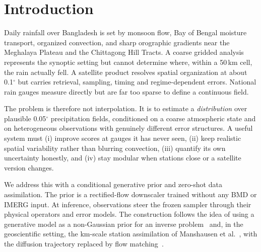 \documentclass[10pt,twocolumn]{article}
\begin{document}
\section{Introduction}

Daily rainfall over Bangladesh is set by monsoon flow, Bay of Bengal moisture
transport, organized convection, and sharp orographic gradients near the
Meghalaya Plateau and the Chittagong Hill Tracts. A coarse gridded analysis
represents the synoptic setting but cannot determine where, within a 50\,km
cell, the rain actually fell. A satellite product resolves spatial
organization at about 0.1$^\circ$ but carries retrieval, sampling, timing and
regime-dependent errors. National rain gauges measure directly but are far too
sparse to define a continuous field.

The problem is therefore not interpolation. It is to estimate a
\emph{distribution} over plausible 0.05$^\circ$ precipitation fields,
conditioned on a coarse atmospheric state and on heterogeneous observations
with genuinely different error structures. A useful system must (i) improve
scores at gauges it has never seen, (ii) keep realistic spatial variability
rather than blurring convection, (iii) quantify its own uncertainty honestly,
and (iv) stay modular when stations close or a satellite version changes.

We address this with a conditional generative prior and zero-shot data
assimilation. The prior is a rectified-flow downscaler trained without any BMD
or IMERG input. At inference, observations steer the frozen sampler through
their physical operators and error models. The construction follows the idea
of using a generative model as a non-Gaussian prior for an inverse
problem~\cite{chung2023,rozet2023sda} and, in the geoscientific setting, the
km-scale station assimilation of Manshausen et al.~\cite{manshausen2025},
with the diffusion trajectory replaced by flow
matching~\cite{lipman2023,liu2023,albergo2023}.
\end{document}
